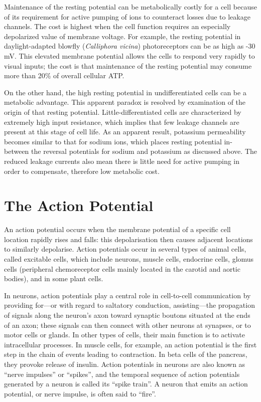 Maintenance of the resting potential can be metabolically costly for a cell because of its requirement for active pumping of ions to counteract losses due to leakage channels. The cost is highest when the cell function requires an especially depolarized value of membrane voltage. For example, the resting potential in daylight-adapted blowfly (\emph{Calliphora vicina}) photoreceptors can be as high as -30 mV. This elevated membrane potential allows the cells to respond very rapidly to visual inputs; the cost is that maintenance of the resting potential may consume more than 20\% of overall cellular ATP.

On the other hand, the high resting potential in undifferentiated cells can be a metabolic advantage. This apparent paradox is resolved by examination of the origin of that resting potential. Little-differentiated cells are characterized by extremely high input resistance, which implies that few leakage channels are present at this stage of cell life. As an apparent result, potassium permeability becomes similar to that for sodium ions, which places resting potential in-between the reversal potentials for sodium and potassium as discussed above. The reduced leakage currents also mean there is little need for active pumping in order to compensate, therefore low metabolic cost.

\hypertarget{the-action-potential}{%
\section{The Action Potential}\label{the-action-potential}}

An action potential occurs when the membrane potential of a specific cell location rapidly rises and falls: this depolarisation then causes adjacent locations to similarly depolarise. Action potentials occur in several types of animal cells, called excitable cells, which include neurons, muscle cells, endocrine cells, glomus cells (peripheral chemoreceptor cells mainly located in the carotid and aortic bodies), and in some plant cells.

In neurons, action potentials play a central role in cell-to-cell communication by providing for---or with regard to saltatory conduction, assisting---the propagation of signals along the neuron's axon toward synaptic boutons situated at the ends of an axon; these signals can then connect with other neurons at synapses, or to motor cells or glands. In other types of cells, their main function is to activate intracellular processes. In muscle cells, for example, an action potential is the first step in the chain of events leading to contraction. In beta cells of the pancreas, they provoke release of insulin. Action potentials in neurons are also known as ``nerve impulses'' or ``spikes'', and the temporal sequence of action potentials generated by a neuron is called its ``spike train''. A neuron that emits an action potential, or nerve impulse, is often said to ``fire''.

